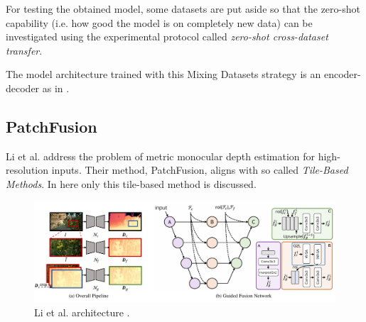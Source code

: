 For testing the obtained model, some datasets are put aside so that the zero-shot capability (i.e. how good the model is on completely new data) can be investigated using the experimental protocol called \textit{zero-shot cross-dataset transfer}.

The model architecture trained with this Mixing Datasets strategy is an encoder-decoder as in \cite{ReDWeb}.

\subsection{PatchFusion}
Li et al. \cite{PatchFusion} address the problem of metric monocular depth estimation for high-resolution inputs.
Their method, PatchFusion, aligns with so called \textit{Tile-Based Methods}.
In here only this tile-based method is discussed.

\begin{figure}
	\centering
	\includegraphics[scale=0.3]{figs/patchfusion}
	\caption{Li et al. architecture \cite{PatchFusion}. \label{fig:patchfusion}}
\end{figure}


